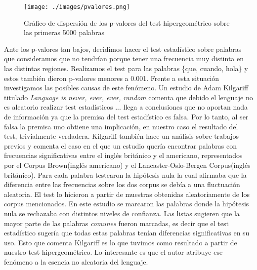 \begin{figure}[!ht]\centering
    \texttt{[image: ./images/pvalores.png]}
    \caption{Gráfico de dispersión de los p-valores del test hipergeométrico sobre las primeras 5000 palabras} 
    \label{fig:p-valores}   
\end{figure}


Ante los p-valores tan bajos, decidimos hacer el test estadístico sobre palabras que consideramos que no tendrían porque tener una frecuencia muy distinta en las distintas regiones. Realizamos el test para las palabras \{que, cuando, hola\} y estos también dieron p-valores menores a 0.001. Frente a esta situación investigamos las posibles causas de este fenómeno.
Un estudio de Adam Kilgariff titulado \textit{Language is never, ever, ever, random}\cite {kilgarriff2005language} comenta que debido el lenguaje no es aleatorio realizar test estadísticos ... llega a conclusiones que no aportan nada de información ya que la premisa del test estadístico es falsa. Por lo tanto, al ser falsa la premisa uno obtiene una implicación, en nuestro caso el resultado del test, trivialmente verdadera. 
Kilgariff también hace un análisis sobre trabajos previos y comenta el caso en el que un estudio quería encontrar palabras con frecuencias significativas entre el inglés británico y el americano, representados por el Corpus Brown(inglés americano) y el Lancaster-Oslo-Bergen Corpus(inglés británico). Para cada palabra testearon la hipótesis nula la cual afirmaba que la diferencia entre las frecuencias sobre los dos corpus se debía a una fluctuación  aleatoria. El test lo hicieron a partir de muestras obtenidas aleatoriamente de los corpus mencionados. En este estudio se marcaron las palabras donde la hipótesis nula se rechazaba con distintos niveles de confianza. Las listas sugieren que la mayor parte de las palabras \textit{comunes} fueron marcadas, es decir que el test estadístico sugería que todas estas palabras tenían diferencias significativas en su uso. Esto que comenta Kilgariff es lo que tuvimos como resultado a partir de nuestro test hipergeométrico. Lo interesante es que el autor atribuye ese fenómeno a la esencia no aleatoria del lenguaje.



